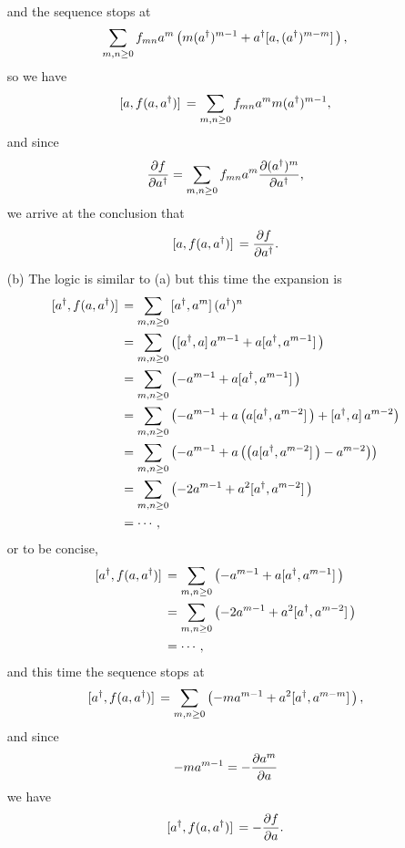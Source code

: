 \documentclass[hyperref, a4paper]{article}
\begin{document}
\begin{itemize}
\[\begin{aligned}
    \end{aligned}
\]
and the sequence stops at 
\[
    \sum_{m, n \geq 0} f_{mn} a^m \left( m (a^\dagger)^{m-1} + a^\dagger \comm*{a}{(a^\dagger)^{m-m}} \right),
\] 
so we have 
\[
    \comm*{a}{f(a, a^\dagger)} = \sum_{m, n \geq 0} f_{mn} a^m m (a^\dagger)^{m-1} ,
\] 
and since 
\[
    \pdv{f}{a^\dagger} = \sum_{m, n \geq 0} f_{mn} a^m \pdv{(a^\dagger)^m}{a^\dagger},
\]
we arrive at the conclusion that
\begin{equation}
    \comm*{a}{f(a, a^\dagger)} = \pdv{f}{a^\dagger}.
    \label{eq:scully-1-4-result-1}
\end{equation}
\item[(b)] The logic is similar to (a) but this time the expansion is
\[
    \begin{aligned}
        \comm*{a^\dagger}{f(a, a^\dagger)} &= \sum_{m, n \geq 0} \comm*{a^\dagger}{a^m} (a^\dagger)^n \\
        &= \sum_{m, n \geq 0} \left( \comm*{a^\dagger}{a} a^{m-1} + a \comm*{a^\dagger}{a^{m-1}} \right) \\
        &= \sum_{m, n \geq 0} \left( - a^{m-1} + a \comm*{a^\dagger}{a^{m-1}} \right) \\
        &= \sum_{m, n \geq 0} \left( - a^{m-1} + a \left( a \comm*{a^\dagger}{a^{m-2}} \right) + \comm*{a^\dagger}{a} a^{m-2} \right) \\
        &= \sum_{m, n \geq 0} \left( - a^{m-1} + a \left( \left( a \comm*{a^\dagger}{a^{m-2}} \right) - a^{m-2} \right) \right) \\
        &= \sum_{m, n \geq 0} \left( - 2 a^{m-1} + a^2 \comm*{a^\dagger}{a^{m-2}} \right) \\
        &= \cdots,
    \end{aligned}
\]
or to be concise, 
\[
    \begin{aligned}
        \comm*{a^\dagger}{f(a, a^\dagger)} &= \sum_{m, n \geq 0} \left( - a^{m-1} + a \comm*{a^\dagger}{a^{m-1}} \right) \\
        &= \sum_{m, n \geq 0} \left( - 2 a^{m-1} + a^2 \comm*{a^\dagger}{a^{m-2}} \right) \\
        &= \cdots,
    \end{aligned}
\]
and this time the sequence stops at
\[
    \comm*{a^\dagger}{f(a, a^\dagger)} = \sum_{m, n \geq 0} \left( - m a^{m-1} + a^2 \comm*{a^\dagger}{a^{m-m}} \right),
\]
and since 
\[
    - m a^{m-1} = - \pdv{a^m}{a}
\]
we have
\begin{equation}
    \comm*{a^\dagger}{f(a, a^\dagger)} = - \pdv{f}{a}.
    \label{eq:scully-1-4-result-2}

\end{equation}
\end{itemize}
\end{document}
